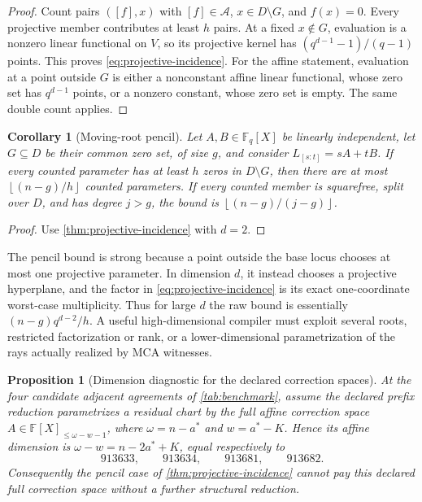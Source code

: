 \documentclass[a4paper,11pt]{amsart}
\newtheorem{proposition}[theorem]{Proposition}
\newtheorem{corollary}[theorem]{Corollary}
\theoremstyle{remark}
\newcommand{\F}{\mathbb F}
\newcommand{\floor}[1]{\left\lfloor#1\right\rfloor}
\begin{document}
\begin{proof}
Count pairs \(([f],x)\) with \([f]\in\mathcal A\),
\(x\in D\setminus G\), and \(f(x)=0\).  Every projective member contributes
at least \(h\) pairs.  At a fixed \(x\notin G\), evaluation is a nonzero
linear functional on \(V\), so its projective kernel has
\((q^{d-1}-1)/(q-1)\) points.  This proves \eqref{eq:projective-incidence}.
For the affine statement, evaluation at a point outside \(G\) is either a
nonconstant affine linear functional, whose zero set has \(q^{d-1}\) points,
or a nonzero constant, whose zero set is empty.  The same double count applies.
\end{proof}

\begin{corollary}[Moving-root pencil]\label{cor:moving-root}
Let \(A,B\in\F_q[X]\) be linearly independent, let \(G\subseteq D\) be their
common zero set, of size \(g\), and consider
\(L_{[s:t]}=sA+tB\).  If every counted parameter has at least \(h\) zeros
in \(D\setminus G\), then there are at most \(\floor{(n-g)/h}\) counted
parameters.  If every counted member is squarefree, split over \(D\), and
has degree \(j>g\), the bound is \(\floor{(n-g)/(j-g)}\).
\end{corollary}

\begin{proof}
Use \cref{thm:projective-incidence} with \(d=2\).
\end{proof}

The pencil bound is strong because a point outside the base locus chooses at
most one projective parameter.  In dimension \(d\), it instead chooses a
projective hyperplane, and the factor in
\eqref{eq:projective-incidence} is its exact one-coordinate worst-case
multiplicity.  Thus for large \(d\) the raw bound is essentially
\((n-g)q^{d-2}/h\).  A useful high-dimensional compiler must exploit several
roots, restricted factorization or rank, or a lower-dimensional
parametrization of the rays actually realized by MCA witnesses.

\begin{proposition}[Dimension diagnostic for the declared correction spaces]\label{prop:not-pencil}
At the four candidate adjacent agreements of \cref{tab:benchmark}, assume
the declared prefix reduction parametrizes a residual chart by the full
affine correction space
\(A\in\F[X]_{\le\omega-w-1}\), where \(\omega=n-a^*\) and
\(w=a^*-K\).  Hence its affine dimension is
\(\omega-w=n-2a^*+K\), equal respectively to
\[
 913633,\qquad913634,\qquad913681,\qquad913682.       \tag{4.2}\label{eq:benchmark-dimensions}
\]
Consequently the pencil case of \cref{thm:projective-incidence} cannot pay
this declared full correction space without a further structural reduction.
\end{proposition}
\end{document}
